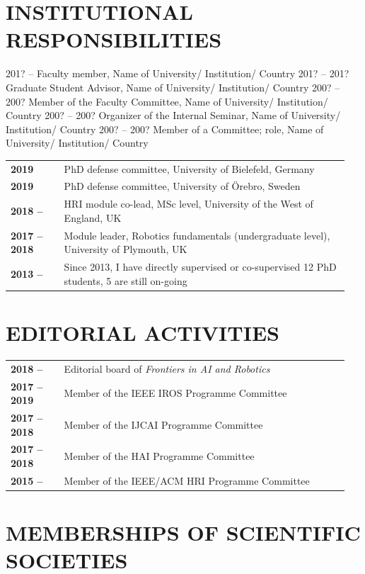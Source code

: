 \documentclass[11pt]{report}
\begin{document}
\section{INSTITUTIONAL RESPONSIBILITIES}

201? – 	Faculty member, Name of University/ Institution/ Country
201? – 201? 	Graduate Student Advisor, Name of University/ Institution/ Country
200? – 200? 	Member of the Faculty Committee, Name of University/ Institution/ Country 
200? – 200? 	Organizer of the Internal Seminar, Name of University/ Institution/ Country
200? – 200? 	Member of a Committee; role, Name of University/ Institution/ Country

\begin{tabular}{p{0.15\linewidth}p{0.8\linewidth}}
    \bf 2019 & PhD defense committee, University of Bielefeld, Germany \\
    \bf 2019 & PhD defense committee, University of Örebro, Sweden \\
    \bf 2018 -- & HRI module co-lead, MSc level, University of the West of England, UK  \\
    \bf 2017 -- 2018 & Module leader, Robotics fundamentals (undergraduate level), University of Plymouth, UK \\
    \bf 2013 --  & Since 2013, I have directly supervised or co-supervised 12
    PhD students, 5 are still on-going \\
\end{tabular}



\section{EDITORIAL ACTIVITIES}


\begin{tabular}{p{0.15\linewidth}p{0.8\linewidth}}
    \bf 2018 -- & Editorial board of \emph{Frontiers in AI and Robotics} \\
    \bf 2017 -- 2019 & Member of the IEEE IROS Programme Committee  \\
    \bf 2017 -- 2018 & Member of the IJCAI Programme Committee  \\
    \bf 2017 -- 2018 & Member of the HAI Programme Committee  \\
    \bf 2015 --  & Member of the IEEE/ACM HRI Programme Committee \\
\end{tabular}


\section{MEMBERSHIPS OF SCIENTIFIC SOCIETIES}
\end{document}
